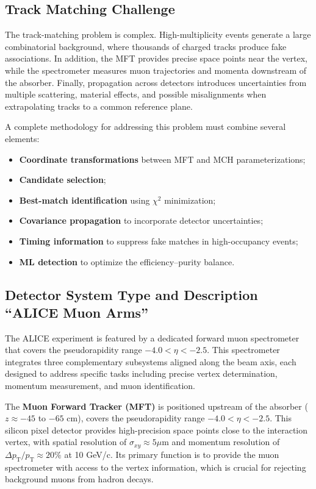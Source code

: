 \documentclass{article}
\begin{document}
\subsection{Track Matching Challenge}
The track-matching problem is complex. High-multiplicity events generate a large combinatorial background, where thousands of charged tracks produce fake associations. In addition, the MFT provides precise space points near the vertex, while the spectrometer measures muon trajectories and momenta downstream of the absorber. Finally, propagation across detectors introduces uncertainties from multiple scattering, material effects, and possible misalignments when extrapolating tracks to a common reference plane.

A complete methodology for addressing this problem must combine several elements:

\begin{itemize}
    \item \textbf{Coordinate transformations} between MFT and MCH parameterizations;
    \item \textbf{Candidate selection};
    \item \textbf{Best-match identification} using $\chi^2$ minimization;
    \item \textbf{Covariance propagation} to incorporate detector uncertainties;
    \item \textbf{Timing information} to suppress fake matches in high-occupancy events;
    \item \textbf{ML detection} to optimize the efficiency--purity balance.
\end{itemize}

\subsection{Detector System Type and Description ``ALICE Muon Arms''}
The ALICE experiment is featured by a dedicated forward muon spectrometer that covers the pseudorapidity range $-4.0 < \eta < -2.5$. This spectrometer integrates three complementary
subsystems aligned along the beam axis, each designed to address specific tasks including precise vertex determination, momentum measurement, and muon identification.

The \textbf{Muon Forward Tracker (MFT)} is positioned upstream of the absorber ($z \approx -45$ to $-65$ cm), covers the pseudorapidity range $-4.0 < \eta < -2.5$.
This silicon pixel detector provides high-precision space points close to the interaction vertex, with spatial resolution of $\sigma_{xy} \approx 5 \mu$m and momentum
resolution of $\Delta p_{\text{T}}/p_{\text{T}} \approx 20\%$ at 10 GeV/c. Its primary function is to provide the muon spectrometer with access to the vertex information,
which is crucial for rejecting background muons from hadron decays.
\end{document}
